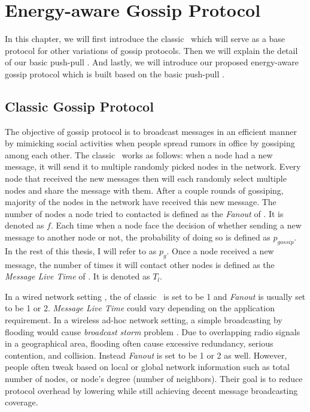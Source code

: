 \chapter{Energy-aware Gossip Protocol}
\label{Chapter3}

In this chapter, we will first introduce the classic \gp ~which will serve as a base protocol for other variations of gossip protocols. Then we will explain the detail of our basic push-pull \gp. And lastly, we will introduce our proposed energy-aware gossip protocol which is built based on the basic push-pull \gp.

\section{Classic Gossip Protocol}

The objective of gossip protocol is to broadcast messages in an efficient manner by mimicking social activities when people spread rumors in office by gossiping among each other. The classic \gp ~works as follows: when a node had a new message, it will send it to multiple randomly picked nodes in the network. Every node that received the new messages then will each randomly select multiple nodes and share the message with them. After a couple rounds of gossiping, majority of the nodes in the network have received this new message. The number of nodes a node tried to contacted is defined as the \emph{Fanout} of \gp. It is denoted as $f$. Each time when a node face the decision of whether sending a new message to another node or not, the probability of doing so is defined as $p_{gossip}$. In the rest of this thesis, I will refer to \emph{\pog} as $p_g$. Once a node received a new message, the number of times it will contact other nodes is defined as the \emph{Message Live Time} of \gp. It is denoted as $T_l$.

In a wired network setting , the \emph{\pog} of classic \gp ~is set to be 1 and \emph{Fanout} is usually set to be 1 or 2. \emph{Message Live Time} could vary depending on the application requirement. In a wireless ad-hoc network setting, a simple broadcasting by flooding would cause \emph{broadcast storm} problem \cite{tseng2002broadcast}. Due to overlapping radio signals in a geographical area, flooding often cause excessive redundancy, serious contention, and collision. Instead \emph{Fanout} is set to be 1 or 2 as well. However, people often tweak \emph{\pog} based on local or global network information such as total number of nodes, or node's degree (number of neighbors). Their goal is to reduce protocol overhead by lowering \emph{\pog} while still achieving decent message broadcasting coverage. 

